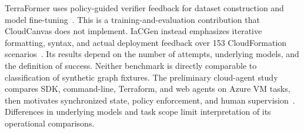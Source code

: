 TerraFormer uses policy-guided verifier feedback for dataset construction and model fine-tuning~\cite{terraformer2026}. This is a training-and-evaluation contribution that CloudCanvas does not implement. IaCGen instead emphasizes iterative formatting, syntax, and actual deployment feedback over 153 CloudFormation scenarios~\cite{iacgen2026}. Its results depend on the number of attempts, underlying models, and the definition of success. Neither benchmark is directly comparable to classification of synthetic graph fixtures. The preliminary cloud-agent study compares SDK, command-line, Terraform, and web agents on Azure VM tasks, then motivates synchronized state, policy enforcement, and human supervision~\cite{agents2025}. Differences in underlying models and task scope limit interpretation of its operational comparisons.

